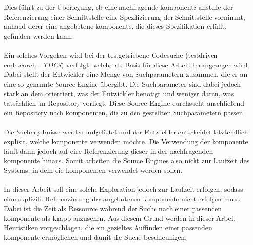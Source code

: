 \\\\
Dies führt zu der Überlegung, ob eine nachfragende \gls{komponente} anstelle der Referenzierung einer Schnittstelle eine Spezifizierung der Schnittstelle vornimmt, anhand derer eine angebotene \gls{komponente}, die dieses Spezifikation erfüllt, gefunden werden kann.
\\\\
Ein solches Vorgehen wird bei der testgetriebene Codesuche (testdriven codesearch - \emph{TDCS}) verfolgt, welche als Basis für diese Arbeit herangezogen wird. Dabei stellt der Entwickler eine Menge von Suchparametern zusammen, die er an eine so genannte Source \Gls{Engine} übergibt. Die Suchparameter sind dabei jedoch stark an dem orientiert, was der Entwickler benötigt und weniger daran, was tatsächlich im Repository vorliegt. Diese Source \Gls{Engine} durchsucht anschließend ein Repository nach \gls{komponente}n, die zu den gestellten Suchparametern passen. 
\\\\
Die Suchergebnisse werden aufgelistet und der Entwickler entscheidet letztendlich explizit, welche \gls{komponente} verwenden möchte. Die Verwendung der \gls{komponente} läuft dann jedoch auf eine Referenzierung dieser in der nachfragenden \gls{komponente} hinaus. Somit arbeiten die Source \Gls{Engine}s also nicht zur Laufzeit des Systems, in dem die \gls{komponente}n verwendet werden sollen.
\\\\
In dieser Arbeit soll eine solche Exploration jedoch zur Laufzeit erfolgen, sodass eine explizite Referenzierung der angebotenen \gls{komponente} nicht erfolgen muss. Dabei ist die Zeit als Ressource während der Suche nach einer passenden \gls{komponente} als knapp anzusehen. Aus diesem Grund werden in dieser Arbeit \Gls{Heuristik}en vorgeschlagen, die ein gezieltes Auffinden einer passenden \gls{komponente} ermöglichen und damit die Suche beschleunigen.

